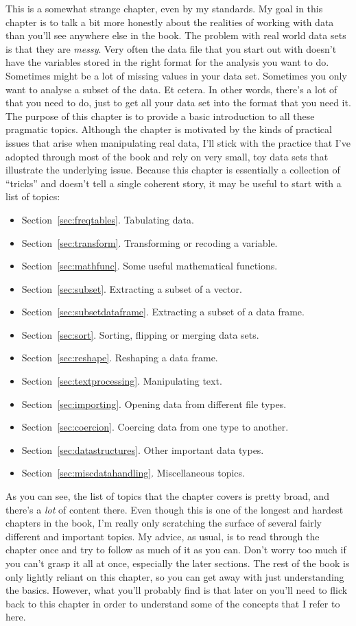 \noindent
This is a somewhat strange chapter, even by my standards. My goal in this chapter is to talk a bit more honestly about the realities of working with data than you'll see anywhere else in the book. The problem with real world data sets is that they are {\it messy}. Very often the data file that you start out with doesn't have the variables stored in the right format for the analysis you want to do. Sometimes might be a lot of missing values in your data set. Sometimes you only want to analyse a subset of the data. Et cetera. In other words, there's a lot of  that you need to do, just to get all your data set into the format that you need it. The purpose of this chapter is to provide a basic introduction to all these pragmatic topics. Although the chapter is motivated by the kinds of practical issues that arise when manipulating real data, I'll stick with the practice that I've adopted through most of the book and rely on very small, toy data sets that illustrate the underlying issue. Because this chapter is essentially a collection of ``tricks'' and doesn't tell a single coherent story, it may be useful to start with a list of topics:
\begin{itemize} \itemsep 0pt
\item Section~\ref{sec:freqtables}. Tabulating data.
\item Section~\ref{sec:transform}. Transforming or recoding a variable.
\item Section~\ref{sec:mathfunc}. Some useful mathematical functions.
\item Section~\ref{sec:subset}. Extracting a subset of a vector.
\item Section~\ref{sec:subsetdataframe}. Extracting a subset of a data frame.
\item Section~\ref{sec:sort}. Sorting, flipping or merging data sets.
\item Section~\ref{sec:reshape}. Reshaping a data frame.
\item Section~\ref{sec:textprocessing}. Manipulating text.
\item Section~\ref{sec:importing}. Opening data from different file types.
\item Section~\ref{sec:coercion}. Coercing data from one type to another.
\item Section~\ref{sec:datastructures}. Other important data types.
\item Section~\ref{sec:miscdatahandling}. Miscellaneous topics.
\end{itemize}
As you can see, the list of topics that the chapter covers is pretty broad, and there's a {\it lot} of content there. Even though this is one of the longest and hardest chapters in the book, I'm really only scratching the surface of several fairly different and important topics. My advice, as usual, is to read through the chapter once and try to follow as much of it as you can. Don't worry too much if you can't grasp it all at once, especially the later sections. The rest of the book is only lightly reliant on this chapter, so you can get away with just understanding the basics. However, what you'll probably find is that later on you'll need to flick back to this chapter in order to understand some of the concepts that I refer to here.
